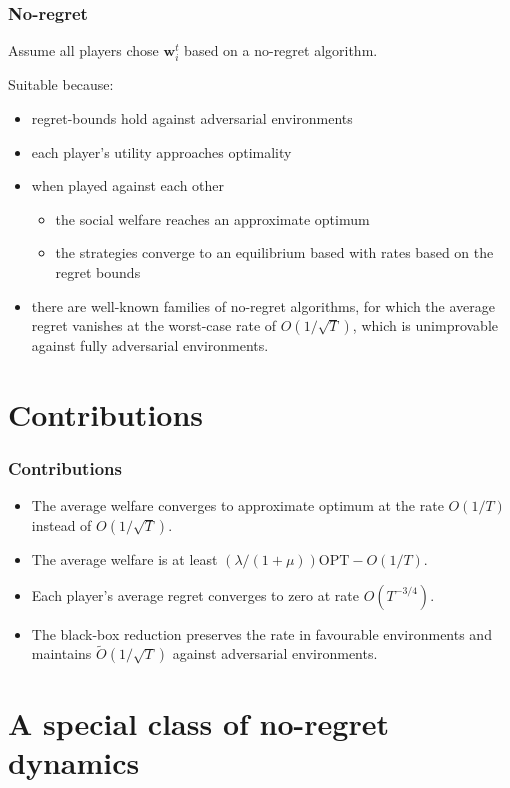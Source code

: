 \documentclass{beamer}
\begin{document}
\begin{frame}
	\frametitle{No-regret}
	Assume all players chose $\mathbf{w}^t_i$ based on a no-regret algorithm.
	
	Suitable because:
	\begin{itemize}
		\item regret-bounds hold against adversarial environments
		\item each player's utility approaches optimality
		\item when played against each other
		\begin{itemize}
			\item the social welfare reaches an approximate optimum
			\item the strategies converge to an equilibrium based with rates based on the regret bounds
		\end{itemize} 
		\item there are well-known families of no-regret algorithms, for which the average regret vanishes at the worst-case rate of $O(1/\sqrt{T})$, which is unimprovable against fully adversarial environments.
	\end{itemize}
\end{frame}

\section{Contributions}

\begin{frame}
	\frametitle{Contributions}

	\begin{itemize}
		\item\alert<2>{ The average welfare converges to approximate optimum at the rate $O(1/T)$ instead of $O(1/\sqrt{T})$.}
		\item The average welfare is at least $ (\lambda / (1 + \mu)) \text{OPT} - O(1/T) $.
		\item Each player's average regret converges to zero at rate $O(T^{-3/4})$.
		\item The black-box reduction preserves the rate in favourable environments and maintains $\tilde{O}(1/\sqrt{T})$ against adversarial environments.
	\end{itemize}
\end{frame}




\section{A special class of no-regret dynamics}
\end{document}
